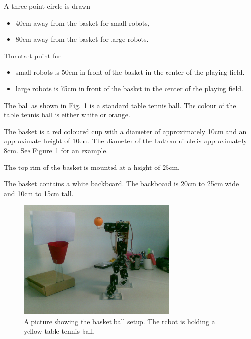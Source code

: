 \documentclass[12pt]{hurocup}
\begin{document}
\begin{lawlist}[BB]
\item A three point circle is drawn 
  \begin{itemize}
    \item 40cm away from the basket for small robots,
    \item 80cm away from the basket for large robots.
  \end{itemize}

\item The start point for
  \begin{itemize}
   \item small robots is 50cm in front of the basket in the center of
    the playing field. 
   \item large robots is 75cm in front of the basket in the center of
    the playing field.
  \end{itemize}

\end{lawlist}


\begin{lawlist}[BB]

  \item The ball as shown in Fig.~\ref{fig:basketball-basket} is a
  standard table tennis ball. The colour of the table tennis ball is
  either white or orange.

  \item The basket is a red coloured cup with a diameter of
  approximately 10cm and an approximate height of 10cm. The diameter
  of the bottom circle is approximately 8cm. See
  Figure~\ref{fig:basketball-basket} for an example.

  \item The top rim of the basket is mounted at a height of 25cm.

  \item The basket contains a white backboard. The backboard is 20cm
  to 25cm wide and 10cm to 15cm tall.

  \begin{figure}
    \begin{center}
      \includegraphics[width=0.7\textwidth]{Figures/basketball-basket}
    \end{center}
    \caption{A picture showing the basket ball setup. The robot is
             holding a yellow table tennis ball.}
    \label{fig:basketball-basket}
  \end{figure}
\end{lawlist}
\end{document}
